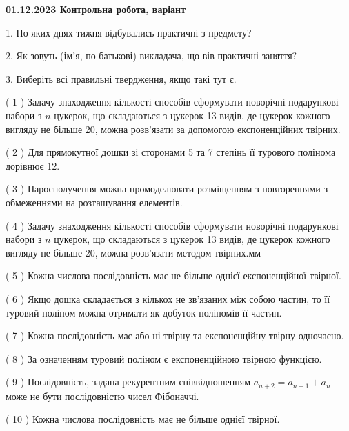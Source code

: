 \documentclass[12pt, ukrainian]{article}
\begin{document}
\vspace{4mm}
\newpage
\begin {large}

\textbf{01.12.2023 Контрольна робота, варіант  }\par


{
1. По яких днях тижня відбувались практичні з предмету?



\vspace{5mm}
2. Як зовуть (ім'я, по батькові) викладача, що вів практичні заняття?



\vspace{5mm}
3. Виберіть всі правильні твердження, якщо такі тут є.\par
\vspace{2mm}
( 1 ) Задачу знаходження кількості способів сформувати новорічні подарункові набори з $n$ цукерок, що складаються з цукерок 13 видів, де цукерок кожного вигляду не більше 20, можна розв’язати за допомогою експоненційних твірних.%

( 2 ) Для прямокутної дошки зі сторонами 5 та 7 степінь її турового полінома дорівнює 12.%

( 3 ) Паросполучення можна промоделювати розміщенням з повтореннями з обмеженнями на розташування елементів.%

( 4 ) Задачу знаходження кількості способів сформувати новорічні подарункові набори з $n$ цукерок, що складаються з цукерок 13 видів, де цукерок кожного вигляду не більше 20, можна розв’язати методом твірних.мм%

( 5 ) Кожна числова послідовність має не більше однієї  експоненційної твірної.%

( 6 ) Якщо дошка складається з кількох не зв’язаних між собою частин, то її туровий поліном можна отримати як добуток поліномів її частин.%

( 7 ) Кожна послідовність має або ні твірну та експоненційну твірну одночасно.%

( 8 ) За означенням туровий поліном є експоненційною твірною функцією.%

( 9 ) Послідовність, задана рекурентним співвідношенням $a_{n+2}=a_{n+1}+a_{n}$ може не бути послідовністю чисел Фібоначчі.%

( 10 ) Кожна числова послідовність має не більше однієї твірної.%
}
\end {large}
\end{document}
